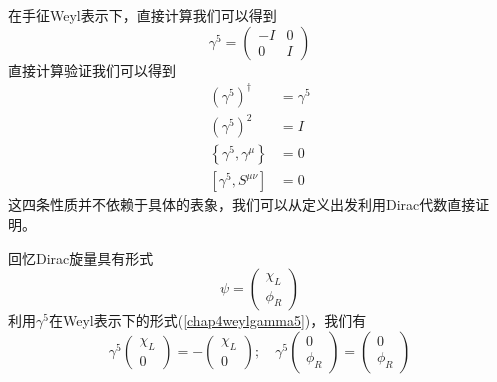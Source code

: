 在手征Weyl表示下，直接计算我们可以得到
\begin{equation}
\label{chap4weylgamma5}
\gamma^{5}=\left(\begin{array}{cc}
    -I & 0 \\
    0 & I
\end{array}\right)
\end{equation}
直接计算验证我们可以得到
\begin{equation}
    \begin{aligned}
    (\gamma^{5})^{\dagger}&=\gamma^{5}\\
    (\gamma^{5})^{2}&=I\\
    \left\{\gamma^{5},\gamma^{\mu}\right\}&=0\\
       \left[\gamma^{5},S^{\mu\nu}\right]&=0 
    \end{aligned}
\end{equation}
这四条性质并不依赖于具体的表象，我们可以从定义出发利用Dirac代数直接证明。

回忆Dirac旋量具有形式
\begin{equation}
    \psi=\left(\begin{array}{cc}
         \chi_{L}  \\
         \phi_{R} 
    \end{array}\right)
\end{equation}
利用$\gamma^{5}$在Weyl表示下的形式(\ref{chap4weylgamma5})，我们有
\begin{equation}
    \gamma^{5}\left(\begin{array}{cc}
         \chi_{L}  \\
         0 
    \end{array}\right)=-\left(\begin{array}{cc}
         \chi_{L}  \\
         0 
    \end{array}\right);\quad \gamma^{5}\left(\begin{array}{cc}
         0  \\
         \phi_{R} 
    \end{array}\right)=\left(\begin{array}{cc}
         0  \\
         \phi_{R} 
    \end{array}\right)
\end{equation}

